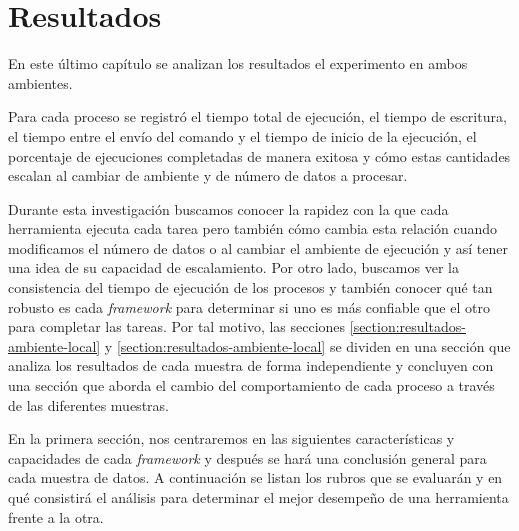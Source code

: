 \chapter{Resultados}
\label{chapter:resultados}

\noindent En este último capítulo se analizan los resultados el experimento en ambos ambientes. 

Para cada proceso se registró el tiempo total de ejecución, el tiempo de escritura, el tiempo entre el envío del comando y el tiempo de inicio de la ejecución, el porcentaje de ejecuciones completadas de manera exitosa y cómo estas cantidades escalan al cambiar de ambiente y de número de datos a procesar.

Durante esta investigación buscamos conocer la rapidez con la que cada herramienta ejecuta cada tarea pero también cómo cambia esta relación cuando modificamos el número de datos o al cambiar el ambiente de ejecución y así tener una idea de su capacidad de escalamiento. Por otro lado, buscamos ver la consistencia del tiempo de ejecución de los procesos y también conocer qué tan robusto es cada \textit{framework} para determinar si uno es más confiable que el otro para completar las tareas. Por tal motivo, las secciones \ref{section:resultados-ambiente-local} y \ref{section:resultados-ambiente-local} se dividen en una sección que analiza los resultados de cada muestra de forma independiente y concluyen con una sección que aborda el cambio del comportamiento de cada proceso a través de las diferentes muestras.

En la primera sección, nos centraremos en las siguientes características y capacidades de cada \textit{framework} y después se hará una conclusión general para cada muestra de datos. A continuación se listan los rubros que se evaluarán y en qué consistirá el análisis para determinar el mejor desempeño de una herramienta frente a la otra.

